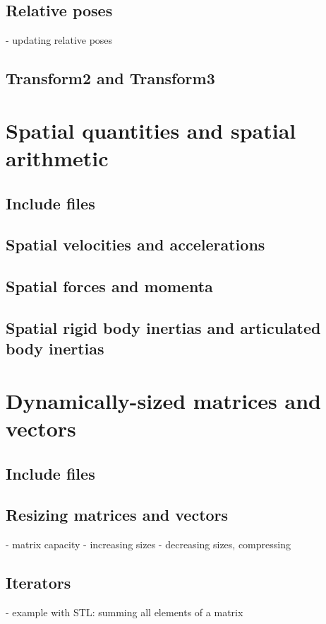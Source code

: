 \documentclass[11pt, letterpaper]{article}
\begin{document}
\subsection{Relative poses}
- updating relative poses

\subsection{Transform2 and Transform3}

\section{Spatial quantities and spatial arithmetic}

\subsection{Include files}

\subsection{Spatial velocities and accelerations}

\subsection{Spatial forces and momenta}

\subsection{Spatial rigid body inertias and articulated body inertias}

\section{Dynamically-sized matrices and vectors}

\subsection{Include files}

\subsection{Resizing matrices and vectors}
- matrix capacity
- increasing sizes
- decreasing sizes, compressing 

\subsection{Iterators}
- example with STL: summing all elements of a matrix
\end{document}
